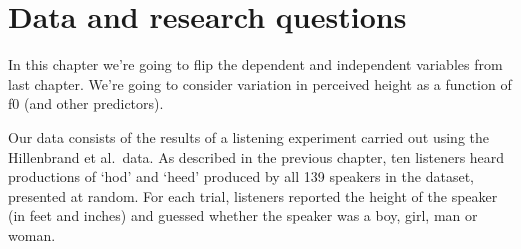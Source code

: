 \documentclass[
]{book}
\newenvironment{Shaded}{\begin{snugshade}}{\end{snugshade}}
\newcommand{\AttributeTok}[1]{\textcolor[rgb]{0.77,0.63,0.00}{#1}}
\newcommand{\CommentTok}[1]{\textcolor[rgb]{0.56,0.35,0.01}{\textit{#1}}}
\newcommand{\FunctionTok}[1]{\textcolor[rgb]{0.00,0.00,0.00}{#1}}
\newcommand{\NormalTok}[1]{#1}
\newcommand{\OtherTok}[1]{\textcolor[rgb]{0.56,0.35,0.01}{#1}}
\newcommand{\SpecialCharTok}[1]{\textcolor[rgb]{0.00,0.00,0.00}{#1}}
\newcommand{\StringTok}[1]{\textcolor[rgb]{0.31,0.60,0.02}{#1}}
\begin{document}
\hypertarget{data-and-research-questions-5}{%
\section{Data and research questions}\label{data-and-research-questions-5}}

In this chapter we're going to flip the dependent and independent variables from last chapter. We're going to consider variation in perceived height as a function of f0 (and other predictors).

Our data consists of the results of a listening experiment carried out using the Hillenbrand et al.~data. As described in the previous chapter, ten listeners heard productions of `hod' and `heed' produced by all 139 speakers in the dataset, presented at random. For each trial, listeners reported the height of the speaker (in feet and inches) and guessed whether the speaker was a boy, girl, man or woman.

\begin{Shaded}
\end{Shaded}
\end{document}
